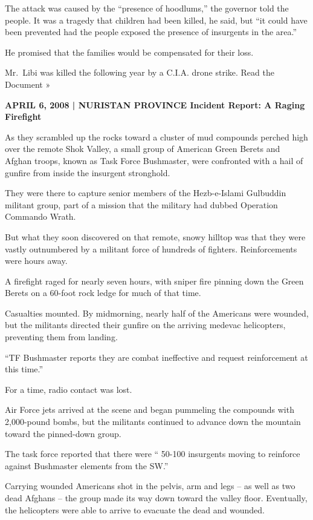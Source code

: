 ﻿\documentclass[12pt]{article}
\begin{document}
The attack was caused by the ``presence of hoodlums,'' the governor told the people. It was a
tragedy that children had been killed, he said, but ``it could have been prevented had the people
exposed the presence of insurgents in the area.''

He promised that the families would be compensated for their loss.

Mr.~Libi was killed the following year by a C.I.A. drone strike. Read the Document »

\textbf{APRIL 6, 2008 | NURISTAN PROVINCE Incident Report: A Raging Firefight}

As they scrambled up the rocks toward a cluster of mud compounds perched high over the remote Shok
Valley, a small group of American Green Berets and Afghan troops, known as Task Force Bushmaster,
were confronted with a hail of gunfire from inside the insurgent stronghold.

They were there to capture senior members of the Hezb-e-Islami Gulbuddin militant group, part of a
mission that the military had dubbed Operation Commando Wrath.

But what they soon discovered on that remote, snowy hilltop was that they were vastly outnumbered by
a militant force of hundreds of fighters. Reinforcements were hours away.

A firefight raged for nearly seven hours, with sniper fire pinning down the Green Berets on a
60-foot rock ledge for much of that time.

Casualties mounted. By midmorning, nearly half of the Americans were wounded, but the militants
directed their gunfire on the arriving medevac helicopters, preventing them from landing.

``TF Bushmaster reports they are combat ineffective and request reinforcement at this time.''

For a time, radio contact was lost.

Air Force jets arrived at the scene and began pummeling the compounds with 2,000-pound bombs, but
the militants continued to advance down the mountain toward the pinned-down group.

The task force reported that there were `` 50-100 insurgents moving to reinforce against Bushmaster
elements from the SW.''

Carrying wounded Americans shot in the pelvis, arm and legs -- as well as two dead Afghans -- the
group made its way down toward the valley floor. Eventually, the helicopters were able to arrive to
evacuate the dead and wounded.
\end{document}
